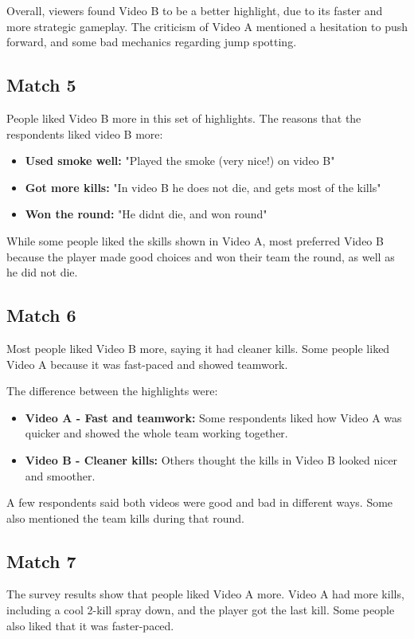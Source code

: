 Overall, viewers found Video B to be a better highlight, due to its faster and more strategic gameplay. The criticism of Video A mentioned a hesitation to push forward, and some bad mechanics regarding jump spotting.
\subsection*{Match 5}
People liked Video B more in this set of highlights.
The reasons that the respondents liked video B more:

\begin{itemize}
\item \textbf{Used smoke well:} "Played the smoke (very nice!) on video B"
\item \textbf{Got more kills:} "In video B he does not die, and gets most of the kills"
\item \textbf{Won the round:} "He didnt die, and won round"
\end{itemize}

While some people liked the skills shown in Video A, most preferred Video B because the player made good choices and won their team the round, as well as he did not die.


\subsection*{Match 6}

Most people liked Video B more, saying it had cleaner kills. Some people liked Video A because it was fast-paced and showed teamwork.

The difference between the highlights were:
\begin{itemize}
\item \textbf{Video A - Fast and teamwork:} Some respondents liked how Video A was quicker and showed the whole team working together.
\item \textbf{Video B - Cleaner kills:} Others thought the kills in Video B looked nicer and smoother.
\end{itemize}

A few respondents said both videos were good and bad in different ways. Some also mentioned the team kills during that round.



\subsection*{Match 7}
The survey results show that people liked Video A more. Video A had more kills, including a cool 2-kill spray down, and the player got the last kill. Some people also liked that it was faster-paced.

